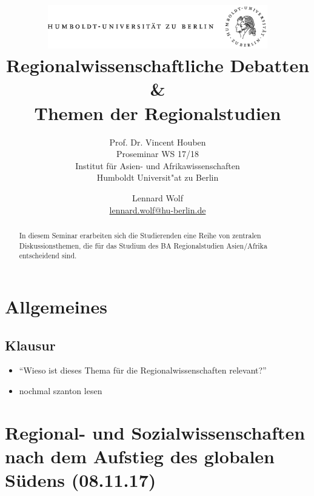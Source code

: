 \documentclass[emulatestandardclasses]{scrartcl}
\date{\vspace{-3ex}}
\begin{document}
\title{
	\includegraphics*[bb=0 0 720 200, width=0.72\textwidth]{ErstesSem/images/hu_logo.png}\\
	\vspace{25pt}
	Regionalwissenschaftliche Debatten\\\&\\
	Themen der Regionalstudien}
\subtitle{\vspace{10pt}
			Prof. Dr. Vincent Houben\\
			Proseminar WS 17/18\\
          Institut für Asien- und Afrikawissenschaften\\ 
          Humboldt Universit"at zu Berlin}
\author{Lennard Wolf\\
        \small{\href{mailto:lennard.wolf@hu-berlin.de}{lennard.wolf@hu-berlin.de}}}
\maketitle
\begin{abstract}
In diesem Seminar erarbeiten sich die Studierenden eine Reihe von zentralen Diskussionsthemen, die für das Studium des BA Regionalstudien Asien/Afrika entscheidend sind.

\end{abstract}
\newpage

\newpage

\section{Allgemeines}

\subsection{Klausur}

\begin{itemize}
  \item "`Wieso ist dieses Thema für die Regionalwissenschaften relevant?"'
  \item nochmal szanton lesen
\end{itemize}


\section{Regional- und Sozialwissenschaften nach dem Aufstieg des globalen Südens (08.11.17)}
\end{document}
